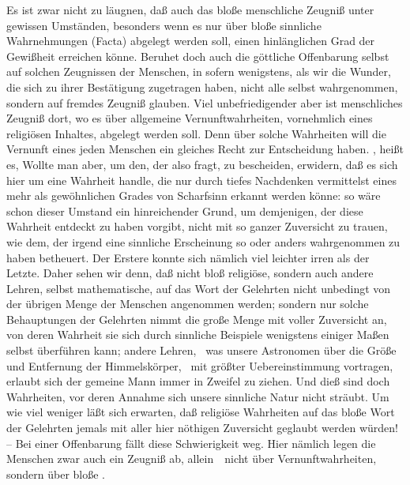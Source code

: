 \begin{aufza}
\item Es ist zwar nicht zu läugnen, daß auch das bloße menschliche Zeugniß unter gewissen Umständen, besonders wenn es nur über bloße sinnliche Wahrnehmungen (Facta) abgelegt werden soll, einen hinlänglichen Grad der Gewißheit erreichen könne. Beruhet doch auch die göttliche Offenbarung selbst auf solchen Zeugnissen der Menschen, in sofern wenigstens, als wir die Wunder, die sich zu ihrer Bestätigung zugetragen haben, nicht alle selbst wahrgenommen, sondern auf fremdes Zeugniß glauben. Viel unbefriedigender aber ist menschliches Zeugniß dort, wo es über allgemeine Vernunftwahrheiten, vornehmlich eines religiösen Inhaltes, abgelegt werden soll. Denn über solche Wahrheiten will die Vernunft eines jeden Menschen ein gleiches Recht zur Entscheidung haben. , heißt es,  Wollte man aber, um den, der also fragt, zu bescheiden, erwidern, daß es sich hier um eine Wahrheit handle, die nur durch tiefes Nachdenken vermittelst eines mehr als gewöhnlichen Grades von Scharfsinn erkannt werden könne: so wäre schon dieser Umstand ein hinreichender Grund, um demjenigen, der diese Wahrheit entdeckt zu haben vorgibt, nicht mit so ganzer Zuversicht zu trauen, wie dem, der irgend eine sinnliche Erscheinung so oder anders wahrgenommen zu haben betheuert. Der Erstere konnte sich nämlich viel leichter irren als der Letzte. Daher sehen wir denn, daß nicht bloß religiöse, sondern auch andere Lehren, selbst mathematische, auf das Wort der Gelehrten nicht unbedingt von der übrigen Menge der Menschen angenommen werden; sondern nur solche Behauptungen der Gelehrten nimmt die große Menge mit voller Zuversicht an, von deren Wahrheit sie sich durch sinnliche Beispiele wenigstens einiger Maßen selbst überführen kann; andere Lehren, \zB\ was unsere Astronomen über die Größe und Entfernung der Himmelskörper, \udgl\  mit größter Uebereinstimmung vortragen, erlaubt sich der gemeine Mann immer in Zweifel zu ziehen. Und dieß sind doch Wahrheiten, vor deren Annahme sich unsere sinnliche Natur nicht sträubt. Um wie viel weniger läßt sich erwarten, daß religiöse Wahrheiten auf das bloße Wort der Gelehrten jemals mit aller hier nöthigen Zuversicht geglaubt werden würden! -- Bei einer Offenbarung fällt diese Schwierigkeit weg. Hier nämlich legen die Menschen zwar auch ein Zeugniß ab, allein~\ nicht über Vernunftwahrheiten, sondern über bloße .

\end{aufza}
